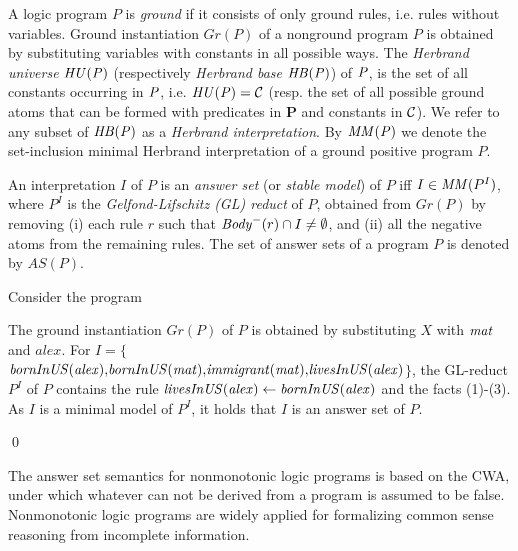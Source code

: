  A logic program $P$ is \emph{ground} if it consists of only ground rules, i.e. rules without
variables. Ground instantiation $Gr(P)$ of a nonground program $P$ is obtained by substituting variables with constants in all possible ways. The \emph{Herbrand universe}  $\mathit{HU(P)}$ (respectively \emph{Herbrand base} $\mathit{HB(P)}$) of $\mathit{P}$, is the set of all constants occurring in $\mathit{P}$, i.e.  $\mathit{HU(P)}=\mathcal{C}$ (resp.
the set of all possible ground atoms that can be formed with predicates in $\mathbf{P}$
and constants in $\mathcal{C}$). We refer to any subset of $\mathit{HB(P)}$ as a \emph{Herbrand interpretation}. By $\mathit{MM(P)}$ we denote the set-inclusion minimal Herbrand interpretation of a ground positive program $P$.


An interpretation $I$ of $P$ is an \emph{answer set} (or \emph{stable model}) of $P$ iff $I \in \mathit{MM}(P^I)$, where $P^I$ is the \emph{Gelfond-Lifschitz (GL) reduct} \cite{GL1988} of $P$, obtained from $Gr(P)$ by removing (i) each rule $r$ such that $\mathit{Body}^-(r) \cap I\neq\emptyset$, and (ii) all the negative atoms from the remaining rules. The set of answer sets of a program $P$ is denoted by $AS(P)$.

\begin{example}
Consider the program \\
{\small {}}
            
\normalsize
{\smallskip

\noindent            
The ground instantiation $Gr(P)$ of $P$ is obtained by substituting $X$ with $\mathit{mat}$ and ${alex}$. For $I{=}\{${\small$\mathit{bornInUS(alex){,}bornInUS(mat){,}immigrant(mat){,}livesInUS(alex)}$}$\}$, the GL-reduct $P^I$ of $P$ contains the rule $\mathit{livesInUS(alex)\leftarrow bornInUS(alex)}$ and the facts (1)-(3). As $I$ is a minimal model of $P^I$, it holds that $I$ is an answer set of $P$.}\qed
\end{example}
\normalsize
The answer set semantics for nonmonotonic logic programs is based on the CWA, under which whatever can not be derived from a program is assumed to be false. Nonmonotonic logic programs are widely applied for formalizing common sense reasoning from incomplete information.
